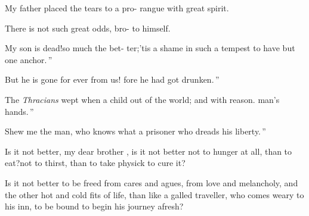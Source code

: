 \documentclass[twoside]{article}
\begin{document}
\tsk My father placed the tears to a pro-\break 
{}
rangue with great spirit.

\indent\lqq There is not such great odds, bro-\break
{}
to himself.\tsh

\indent\lqq My son is dead!\tsk so much the bet-\break
\lqq ter;\tsk ’tis a shame in such a tempest to\break
\lqq have but one anchor.\,”

\indent\lqq But he is gone for ever from us!\tsk\break
{}
\lqq fore he had got drunken.\,”

\indent\lqq The \textit{Thracians} wept when a child\break
{}
\lqq out of the world; and with reason.\tsk{}
\lqq man’s hands.\,”

\indent\lqq Shew me the man, who knows what\break
{}
\lqq a prisoner who dreads his liberty.\,”

Is it not better, my dear brother \toby,\break
{}
\tsk is it not better not to hunger at all, than to eat?\tsk not to thirst, than to
take physick to cure it?

Is it not better to be freed from cares and agues, from love and
melancholy, and the other hot and cold fits of life, than like
a galled traveller, who comes weary to his inn, to be bound to
begin his journey afresh?
\end{document}
